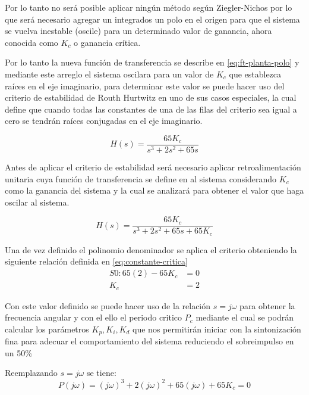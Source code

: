 \documentclass[conference]{IEEEtran}
\begin{document}
	Por lo tanto no será posible aplicar ningún método según Ziegler-Nichos por lo que será necesario agregar un integrados un polo en el origen para que el sistema se vuelva inestable (oscile) para un determinado valor de ganancia, ahora conocida como $K_c$ o ganancia crítica.
	
	Por lo tanto la nueva función de transferencia se describe en \ref{eq:ft-planta-polo} y mediante este arreglo el sistema oscilara para un valor de $K_c$ que establezca raíces en el eje imaginario, para determinar este valor se puede hacer uso del criterio de estabilidad de Routh Hurtwitz en uno de sus casos especiales, la cual define que cuando todas las constantes de una de las filas del criterio sea igual a cero se tendrán raíces conjugadas en el eje imaginario.
	
	\begin{equation}
		H(s) = \frac{65K_c}{s^3 + 2s^2 + 65s}
		\label{eq:ft-planta-polo}
	\end{equation}
	
	Antes de aplicar el criterio de estabilidad será necesario aplicar retroalimentación unitaria cuya función de transferencia se define en al sistema considerando $K_c$ como la ganancia del sistema y la cual se analizará para obtener el valor que haga oscilar al sistema.
	
	\begin{equation}
		H(s) = \frac{65K_c}{s^3 + 2s^2 + 65s + 65K_c}
		\label{eq:ft-planta-retroalimentacion}
	\end{equation}
	
	Una de vez definido el polinomio denominador se aplica el criterio obteniendo la siguiente relación definida en \ref{eq:constante-critica}
	\begin{align}
		S0 : 65(2) - 65K_c &= 0 \\
		K_c &= 2
		\label{eq:constante-critica}
	\end{align}
	
	Con este valor definido se puede hacer uso de la relación $s = j\omega$ para obtener la frecuencia angular y con el ello el periodo critico $P_c$ mediante el cual se podrán calcular los parámetros $K_p, K_i, K_d$ que nos permitirán iniciar con la sintonización fina para adecuar el comportamiento del sistema reduciendo el sobreimpulso en un 50\%
	
	Reemplazando $s =j\omega$ se tiene:
	\begin{equation}
		P(j\omega) = (j\omega)^3 +2 (j\omega)^2 + 65(j\omega) + 65K_c = 0
		\label{eq:ft-jw}
	\end{equation}
	
\end{document}
